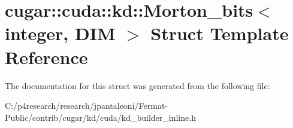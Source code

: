 \hypertarget{structcugar_1_1cuda_1_1kd_1_1_morton__bits}{}\section{cugar\+:\+:cuda\+:\+:kd\+:\+:Morton\+\_\+bits$<$ integer, D\+IM $>$ Struct Template Reference}
\label{structcugar_1_1cuda_1_1kd_1_1_morton__bits}


The documentation for this struct was generated from the following file\+:\begin{DoxyCompactItemize}
\item 
C\+:/p4research/research/jpantaleoni/\+Fermat-\/\+Public/contrib/cugar/kd/cuda/kd\+\_\+builder\+\_\+inline.\+h\end{DoxyCompactItemize}
